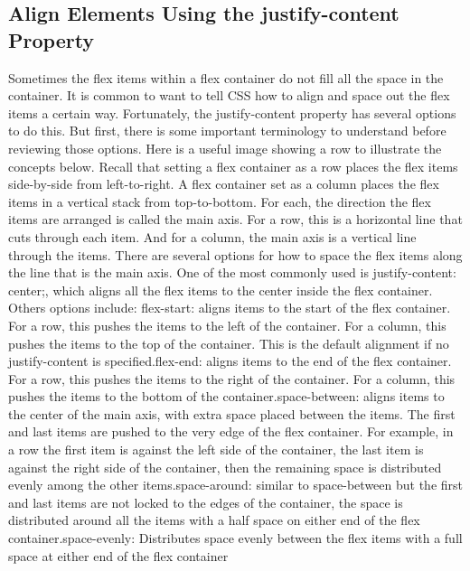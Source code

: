 \documentclass{article}%
\begin{document}
%
\subsection{Align Elements Using the justify{-}content Property}%
\label{subsec:AlignElementsUsingthejustify{-}contentProperty}%
Sometimes the flex items within a flex container do not fill all the space in the container. It is common to want to tell CSS how to align and space out the flex items a certain way. Fortunately, the justify{-}content property has several options to do this. But first, there is some important terminology to understand before reviewing those options.\newline%
Here is a useful image showing a row to illustrate the concepts below.\newline%
Recall that setting a flex container as a row places the flex items side{-}by{-}side from left{-}to{-}right. A flex container set as a column places the flex items in a vertical stack from top{-}to{-}bottom. For each, the direction the flex items are arranged is called the main axis. For a row, this is a horizontal line that cuts through each item. And for a column, the main axis is a vertical line through the items.\newline%
There are several options for how to space the flex items along the line that is the main axis. One of the most commonly used is justify{-}content: center;, which aligns all the flex items to the center inside the flex container. Others options include:\newline%
flex{-}start: aligns items to the start of the flex container. For a row, this pushes the items to the left of the container. For a column, this pushes the items to the top of the container. This is the default alignment if no justify{-}content is specified.flex{-}end: aligns items to the end of the flex container. For a row, this pushes the items to the right of the container. For a column, this pushes the items to the bottom of the container.space{-}between: aligns items to the center of the main axis, with extra space placed between the items. The first and last items are pushed to the very edge of the flex container. For example, in a row the first item is against the left side of the container, the last item is against the right side of the container, then the remaining space is distributed evenly among the other items.space{-}around: similar to space{-}between but the first and last items are not locked to the edges of the container, the space is distributed around all the items with a half space on either end of the flex container.space{-}evenly: Distributes space evenly between the flex items with a full space at either end of the flex container\newline%
\end{document}
